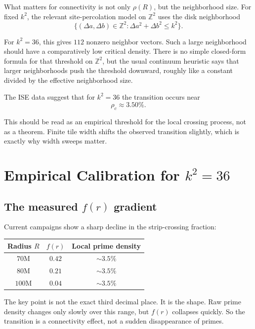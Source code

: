\documentclass[12pt,letterpaper]{article}
\theoremstyle{definition}
\theoremstyle{remark}
\begin{document}
What matters for connectivity is not only $\rho(R)$, but the neighborhood size. For fixed $k^2$, the relevant site-percolation model on $\mathbb{Z}^2$ uses the disk neighborhood
\[
\{(\Delta a,\Delta b)\in\mathbb{Z}^2 : \Delta a^2+\Delta b^2\le k^2\}.
\]

For $k^2=36$, this gives $112$ nonzero neighbor vectors. Such a large neighborhood should have a comparatively low critical density. There is no simple closed-form formula for that threshold on $\mathbb{Z}^2$, but the usual continuum heuristic says that larger neighborhoods push the threshold downward, roughly like a constant divided by the effective neighborhood size.

The ISE data suggest that for $k^2=36$ the transition occurs near
\[
\rho_c \approx 3.50\%.
\]

This should be read as an empirical threshold for the local crossing process, not as a theorem. Finite tile width shifts the observed transition slightly, which is exactly why width sweeps matter.

\section{Empirical Calibration for \texorpdfstring{$k^2=36$}{k\^{}2=36}}

\subsection{The measured \texorpdfstring{$f(r)$}{f(r)} gradient}

Current campaigns show a sharp decline in the strip-crossing fraction:

\begin{center}
\begin{tabular}{@{}ccc@{}}
\toprule
Radius $R$ & $f(r)$ & Local prime density \\
\midrule
$70$M & $0.42$ & $\sim 3.5\%$ \\
$80$M & $0.21$ & $\sim 3.5\%$ \\
$100$M & $0.04$ & $\sim 3.5\%$ \\
\bottomrule
\end{tabular}
\end{center}

The key point is not the exact third decimal place. It is the shape. Raw prime density changes only slowly over this range, but $f(r)$ collapses quickly. So the transition is a connectivity effect, not a sudden disappearance of primes.
\end{document}
